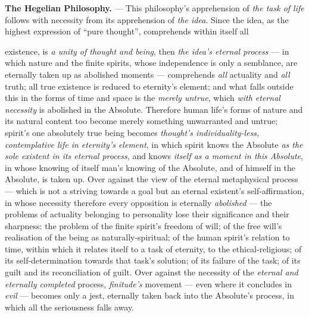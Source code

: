 \documentclass[12pt,a4paper]{book}
\begin{document}
\textbf{The Hegelian Philosophy.} --- This philosophy's apprehension of
\emph{the task of life} follows with necessity from its apprehension of
\emph{the idea}. Since the idea, as the highest expression of ``pure thought'',
comprehends within itself all

existence, is \emph{a unity of thought and being}, then \emph{the idea's
eternal process} --- in which nature and the finite spirits, whose
independence is only a semblance, are eternally taken up as abolished moments
--- comprehends \emph{all} actuality and \emph{all} truth; all true existence
is reduced to eternity's element; and what falls outside this in the forms of
time and space is the \emph{merely untrue}, which \emph{with eternal
necessity} is abolished in the Absolute. Therefore human life's forms of
nature and its natural content too become merely something unwarranted and
untrue; spirit's one absolutely true being becomes \emph{thought's
individuality-less, contemplative life in eternity's element}, in which spirit
knows the Absolute \emph{as the sole existent in its eternal process}, and
knows \emph{itself as a moment in this Absolute}, in whose knowing of itself
man's knowing of the Absolute, and of himself in the Absolute, is taken up.
Over against the view of the eternal metaphysical process --- which is not a
striving towards a goal but an eternal
existent's self-affirmation, in whose necessity therefore every opposition is
eternally \emph{abolished} --- the problems of actuality belonging to
personality lose their significance and their sharpness: the problem of the
finite spirit's freedom of will; of the free will's realisation of the being as
naturally-spiritual; of the human spirit's relation to time, within which it
relates itself to a task of eternity, to the ethical-religious; of its
self-determination towards that task's solution; of its failure of the task; of
its guilt and its reconciliation of guilt. Over against the necessity of the
\emph{eternal and eternally completed} process, \emph{finitude's} movement ---
even where it concludes in \emph{evil} --- becomes only a jest, eternally taken
back into the Absolute's process, in which all the seriousness falls away.
\end{document}
